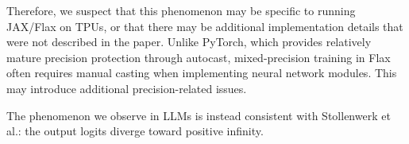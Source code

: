 \documentclass{article}
\theoremstyle{plain}
\theoremstyle{definition}
\theoremstyle{remark}
\begin{document}
Therefore, we suspect that this phenomenon may be specific to running JAX/Flax on TPUs, 
or that there may be additional implementation details that were not described in the paper. 
Unlike PyTorch, which provides relatively mature precision protection through autocast, 
mixed-precision training in Flax often requires manual casting when implementing neural network modules. 
This may introduce additional precision-related issues.

The phenomenon we observe in LLMs is instead consistent with Stollenwerk et al.: 
the output logits diverge toward positive infinity.

\end{document}
